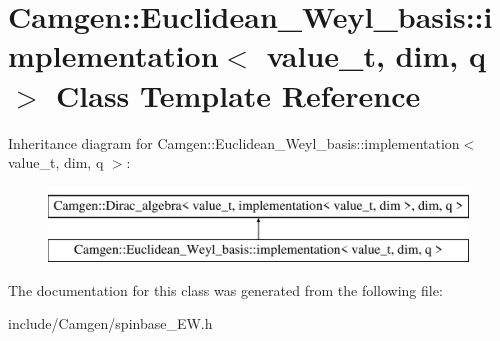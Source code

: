 \hypertarget{a00284}{\section{Camgen\-:\-:Euclidean\-\_\-\-Weyl\-\_\-basis\-:\-:implementation$<$ value\-\_\-t, dim, q $>$ Class Template Reference}
\label{a00284}
}
Inheritance diagram for Camgen\-:\-:Euclidean\-\_\-\-Weyl\-\_\-basis\-:\-:implementation$<$ value\-\_\-t, dim, q $>$\-:\begin{figure}[H]
\begin{center}
\leavevmode
\includegraphics[height=2.000000cm]{a00284}
\end{center}
\end{figure}


The documentation for this class was generated from the following file\-:\begin{DoxyCompactItemize}
\item 
include/\-Camgen/spinbase\-\_\-\-E\-W.\-h\end{DoxyCompactItemize}
